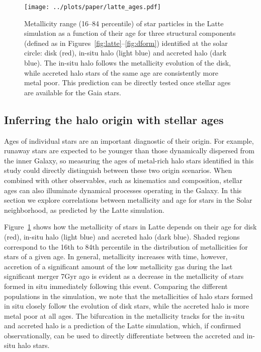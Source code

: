 \documentclass[apj, twocolappendix, numberedappendix, appendixfloats]{emulateapj}
\begin{document}
\begin{figure}
\begin{center}
\texttt{[image: ../plots/paper/latte\_ages.pdf]}
\caption{Metallicity range (16--84 percentile) of star particles in the Latte simulation as a function of their age for three structural components (defined as in Figures~\ref{fig:latte}--\ref{fig:dform}) identified at the solar circle: disk (red), in-situ halo (light blue) and accreted halo (dark blue).
The in-situ halo follows the metallicity evolution of the disk, while accreted halo stars of the same age are consistently more metal poor.
This prediction can be directly tested once stellar ages are available for the Gaia stars.}
\label{fig:ages}
\end{center}
\end{figure}

\subsection{Inferring the halo origin with stellar ages}
\label{sec:ages}
Ages of individual stars are an important diagnostic of their origin.
For example, runaway stars are expected to be younger than those dynamically dispersed from the inner Galaxy, so measuring the ages of metal-rich halo stars identified in this study could directly distinguish between these two origin scenarios.
When combined with other observables, such as kinematics and composition, stellar ages can also illuminate dynamical processes operating in the Galaxy.
In this section we explore correlations between metallicity and age for stars in the Solar neighborhood, as predicted by the Latte simulation.

Figure~\ref{fig:ages} shows how the metallicity of stars in Latte depends on their age for disk (red), in-situ halo (light blue) and accreted halo (dark blue).
Shaded regions correspond to the 16th to 84th percentile in the distribution of metallicities for stars of a given age.
In general, metallicity increases with time, however, accretion of a significant amount of the low metallicity gas during the last significant merger 7\;Gyr ago is evident as a decrease in the metallicity of stars formed in situ immediately following this event.
Comparing the different populations in the simulation, we note that the metallicities of halo stars formed in situ closely follow the evolution of disk stars, while the accreted halo is more metal poor at all ages.
The bifurcation in the metallicity tracks for the in-situ and accreted halo is a prediction of the Latte simulation, which, if confirmed observationally, can be used to directly differentiate between the accreted and in-situ halo stars.
\end{document}
